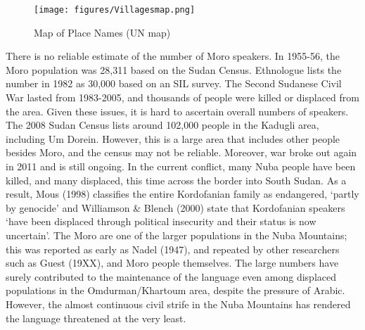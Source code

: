 \begin{figure}
  \texttt{[image: figures/Villagesmap.png]}
    \caption{Map of Place Names (UN map)}
  \label{fig:1-1}
\end{figure}

There is no reliable estimate of the number of Moro speakers. In 1955-56, the Moro population was 28,311 based on the Sudan Census. Ethnologue lists the number in 1982 as 30,000 based on an SIL survey. The Second Sudanese Civil War lasted from 1983-2005, and thousands of people were killed or displaced from the area. Given these issues, it is hard to ascertain overall numbers of speakers. The 2008 Sudan Census lists around 102,000 people in the Kadugli area, including Um Dorein. However, this is a large area that includes other people besides Moro, and the census may not be reliable. Moreover, war broke out again in 2011 and is still ongoing. In the current conflict, many Nuba people have been killed, and many displaced, this time across the border into South Sudan. As a result, Mous (1998) classifies the entire Kordofanian family as endangered, ‘partly by genocide’ and Williamson \& Blench (2000) state that Kordofanian speakers ‘have been displaced through political insecurity and their status is now uncertain’. The Moro are one of the larger populations in the Nuba Mountains; this was reported as early as Nadel (1947), and repeated by other researchers such as Guest (19XX), and Moro people themselves. The large numbers have surely contributed to the maintenance of the language even among displaced populations in the Omdurman/Khartoum area, despite the pressure of Arabic. However, the almost continuous civil strife in the Nuba Mountains has rendered the language threatened at the very least. 


